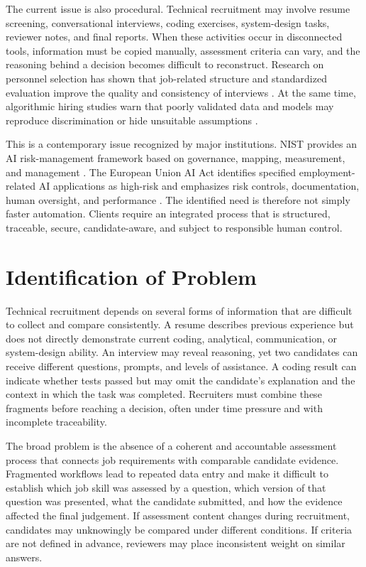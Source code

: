 \documentclass[12pt,a4paper,oneside]{report}
\renewcommand{\cite}[1]{}
\begin{document}
The current issue is also procedural. Technical recruitment may involve resume
screening, conversational interviews, coding exercises, system-design tasks, reviewer
notes, and final reports. When these activities occur in disconnected tools,
information must be copied manually, assessment criteria can vary, and the reasoning
behind a decision becomes difficult to reconstruct. Research on personnel selection
has shown that job-related structure and standardized evaluation improve the quality
and consistency of interviews \cite{campion1997,schmidt1998}. At the same time,
algorithmic hiring studies warn that poorly validated data and models may reproduce
discrimination or hide unsuitable assumptions \cite{kochling2020,raghavan2020}.

This is a contemporary issue recognized by major institutions. NIST provides an AI
risk-management framework based on governance, mapping, measurement, and management
\cite{nist2023}. The European Union AI Act identifies specified employment-related AI
applications as high-risk and emphasizes risk controls, documentation, human
oversight, and performance \cite{eu2024}. The identified need is therefore not simply
faster automation. Clients require an integrated process that is structured,
traceable, secure, candidate-aware, and subject to responsible human control.

\clearpage
\section{Identification of Problem}

Technical recruitment depends on several forms of information that are difficult to
collect and compare consistently. A resume describes previous experience but does not
directly demonstrate current coding, analytical, communication, or system-design
ability. An interview may reveal reasoning, yet two candidates can receive different
questions, prompts, and levels of assistance. A coding result can indicate whether
tests passed but may omit the candidate's explanation and the context in which the
task was completed. Recruiters must combine these fragments before reaching a
decision, often under time pressure and with incomplete traceability.

The broad problem is the absence of a coherent and accountable assessment process
that connects job requirements with comparable candidate evidence. Fragmented
workflows lead to repeated data entry and make it difficult to establish which job
skill was assessed by a question, which version of that question was presented, what
the candidate submitted, and how the evidence affected the final judgement. If
assessment content changes during recruitment, candidates may unknowingly be compared
under different conditions. If criteria are not defined in advance, reviewers may
place inconsistent weight on similar answers.
\end{document}
